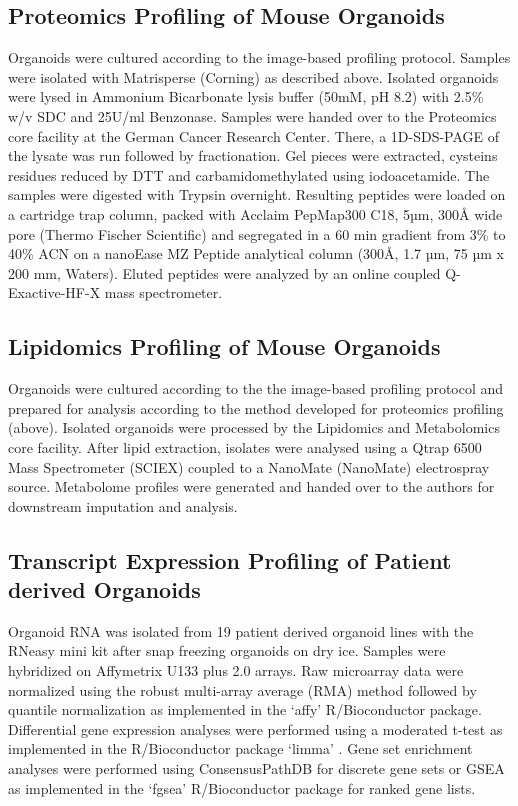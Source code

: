 \begin{flushleft}
\subsection{Proteomics Profiling of Mouse Organoids}
Organoids were cultured according to the image-based profiling protocol. Samples were isolated with Matrisperse (Corning) as described above. Isolated organoids were lysed in Ammonium Bicarbonate lysis buffer (50mM, pH 8.2) with 2.5\% w/v SDC and 25U/ml Benzonase. 
Samples were handed over to the Proteomics core facility at the German Cancer Research Center. There, a 1D-SDS-PAGE of the lysate was run followed by fractionation. Gel pieces were extracted, cysteins residues reduced by DTT and carbamidomethylated using iodoacetamide. The samples were digested with Trypsin overnight.
Resulting peptides were loaded on a cartridge trap column, packed with Acclaim PepMap300 C18, 5µm, 300Å wide pore (Thermo Fischer Scientific) and segregated in a 60 min gradient from 3\% to 40\% ACN on a nanoEase MZ Peptide analytical column (300Å, 1.7 µm, 75 µm x 200 mm, Waters). Eluted peptides were analyzed by an online coupled Q-Exactive-HF-X mass spectrometer.

\subsection{Lipidomics Profiling of Mouse Organoids}
Organoids were cultured according to the the image-based profiling protocol and prepared for analysis according to the method developed for proteomics profiling (above). 
Isolated organoids were processed by the Lipidomics and Metabolomics core facility. 
After lipid extraction, isolates were analysed using a Qtrap 6500 Mass Spectrometer (SCIEX) coupled to a NanoMate (NanoMate) electrospray source. Metabolome profiles were generated and handed over to the authors for downstream imputation and analysis.

\subsection{Transcript Expression Profiling of Patient derived Organoids}
Organoid RNA was isolated from 19 patient derived organoid lines with the RNeasy mini kit after snap freezing organoids on dry ice. Samples were hybridized on Affymetrix U133 plus 2.0 arrays. Raw microarray data were normalized using the robust multi-array average (RMA) method \parencite{irizarryExplorationNormalizationSummaries2003} followed by quantile normalization as implemented in the ‘affy’ \parencite{gautierAffyAnalysisAffymetrix2004} R/Bioconductor \parencite{huberOrchestratingHighthroughputGenomic2015} package. Differential gene expression analyses were performed using a moderated t-test as implemented in the R/Bioconductor package ‘limma’ \parencite{ritchieLimmaPowersDifferential2015}. Gene set enrichment analyses were performed using ConsensusPathDB \parencite{kamburovConsensusPathDBMoreComplete2011} for discrete gene sets or GSEA as implemented in the ‘fgsea’ R/Bioconductor package for ranked gene lists.


\end{flushleft}
